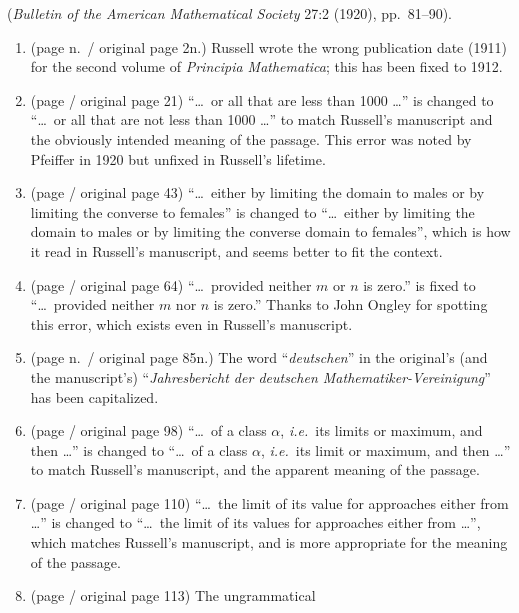 (\textit{Bulletin of the American Mathematical Society} 27:2 (1920), pp.\ 81--90). 
\begin{enumerate}
 \item (page \pageref{change:pmyear}n.\ / original page 2n.) Russell wrote the wrong 
publication date (1911) for the second volume of \textit{Principia Mathematica};
this has been fixed to 1912.
\item (page \pageref{change:notless} / original page 21) ``\ldots\ or all that are 
less than 1000 \ldots''
is changed to ``\ldots\ or all that are not less than 1000 \ldots'' to
match Russell's manuscript and the obviously intended meaning of the passage.
This error was noted by Pfeiffer in 1920 but unfixed in Russell's lifetime.
\item (page \pageref{change:conversedomain} / original page 43) ``\ldots\ either by limiting the domain to 
males or by limiting the converse to females'' is \aftonly{\linebreak}changed to ``\ldots\ either by limiting the domain to
males or by limiting the converse domain to females'', which is how it read in Russell's manuscript, and 
seems better to fit the context.
\item (page \pageref{change:ornor} / original page 64) ``\ldots\ provided neither $m$ or $n$ is zero.'' 
is fixed to ``\ldots\ provided neither $m$ nor $n$ is zero.'' Thanks to John Ongley
for spotting this error, which exists even in Russell's manuscript.
\item (page \pageref{change:deutschen}n.\ / original page 85n.) The word ``\textit{deutschen}'' in the original's (and the man\-u\-script's) ``\textit{Jahresbericht der 
deutschen Math\-e\-mat\-i\-ker-Ver\-ein\-i\-gung}'' has been capitalized.
\item (page \pageref{change:limitslimit} / original page 98) ``\ldots\ of a 
class $\alpha$, \textit{i.e.}\ its limits or maximum, and then \ldots''
is changed to ``\ldots\ of a 
class $\alpha$, \textit{i.e.}\ its limit or maximum, and then \ldots'' to
match Russell's manuscript, and the apparent meaning of the passage.
\item (page \pageref{change:valuevalues} / original page 110) ``\ldots\ the limit of its value %
for ap\-proach\-es either from \ldots'' is changed to ``\ldots\ the limit of its values %
for ap\-proach\-es either from \ldots'', which matches
Russell's manuscript, and is more appropriate for the meaning of the passage.
\item (page \pageref{change:advantage} / original page 113) The ungrammatical

\end{enumerate}
